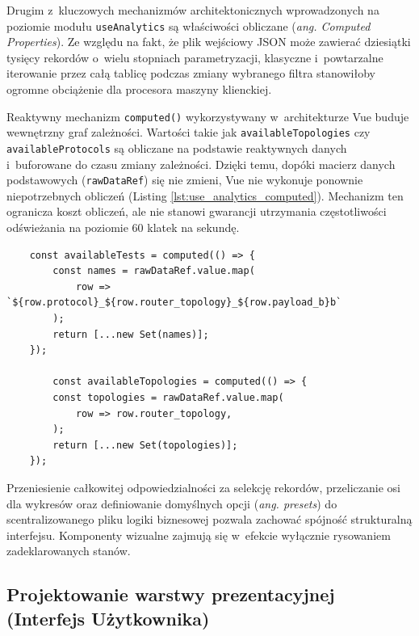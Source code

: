 Drugim z~kluczowych mechanizmów architektonicznych wprowadzonych na poziomie modułu \texttt{useAnalytics} są właściwości obliczane (\textit{ang. Computed Properties}).
Ze względu na fakt, że plik wejściowy JSON może zawierać dziesiątki tysięcy rekordów o~wielu stopniach parametryzacji, klasyczne i~powtarzalne iterowanie przez całą tablicę podczas zmiany wybranego filtra stanowiłoby ogromne obciążenie dla procesora maszyny klienckiej.

Reaktywny mechanizm \texttt{computed()} wykorzystywany w~architekturze Vue buduje wewnętrzny graf zależności.
Wartości takie jak \texttt{availableTopologies} czy \texttt{availableProtocols} są obliczane na podstawie reaktywnych danych i~buforowane do czasu zmiany zależności.
Dzięki temu, dopóki macierz danych podstawowych (\texttt{rawDataRef}) się nie zmieni, Vue nie wykonuje ponownie niepotrzebnych obliczeń (Listing \ref{lst:use_analytics_computed}).
Mechanizm ten ogranicza koszt obliczeń, ale nie stanowi gwarancji utrzymania częstotliwości odświeżania na poziomie 60 klatek na sekundę.

\begin{listing}[htbp]
	\caption{Mechanika agregacji i~buforowania danych słownikowych (\texttt{useAnalytics.ts}) \cite{espy_nexus_nuxt_dashboard}.}
	\label{lst:use_analytics_computed}
	\begin{verbatim}
	const availableTests = computed(() => {
		const names = rawDataRef.value.map(
			row => `${row.protocol}_${row.router_topology}_${row.payload_b}b`
		);
		return [...new Set(names)];
	});

    	const availableTopologies = computed(() => {
		const topologies = rawDataRef.value.map(
			row => row.router_topology,
		);
		return [...new Set(topologies)];
	});
\end{verbatim}
\end{listing}

Przeniesienie całkowitej odpowiedzialności za selekcję rekordów, przeliczanie osi dla wykresów oraz definiowanie domyślnych opcji (\textit{ang. presets}) do scentralizowanego pliku logiki biznesowej pozwala zachować spójność strukturalną interfejsu.
Komponenty wizualne zajmują się w~efekcie wyłącznie rysowaniem zadeklarowanych stanów.

\subsection{Projektowanie warstwy prezentacyjnej (Interfejs Użytkownika)}
\label{subsec:projektowanie-warstwy-prezentacyjnej}

